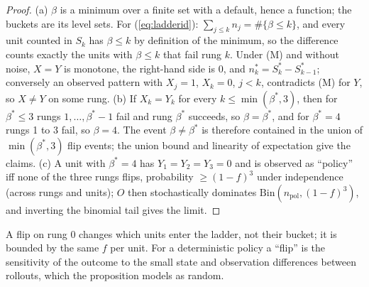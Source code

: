 \documentclass{article}
\begin{document}
\begin{proof}
(a) $\beta$ is a minimum over a finite set with a default, hence a function; the buckets are its level sets. For
(\ref{eq:ladderid}): $\sum_{j\le k} n_j = \#\{\beta \le k\}$, and every unit counted in $S_k$ has $\beta \le k$ by
definition of the minimum, so the difference counts exactly the units with $\beta \le k$ that fail rung $k$. Under
(M) and without noise, $X = Y$ is monotone, the right-hand side is 0, and $n^*_k = S^*_k - S^*_{k-1}$; conversely an
observed pattern with $X_j = 1$, $X_k = 0$, $j < k$, contradicts (M) for $Y$, so $X \ne Y$ on some rung.
(b) If $X_k = Y_k$ for every $k \le \min(\beta^*, 3)$, then for $\beta^* \le 3$ rungs $1, \dots, \beta^* - 1$ fail and
rung $\beta^*$ succeeds, so $\beta = \beta^*$, and for $\beta^* = 4$ rungs 1 to 3 fail, so $\beta = 4$. The event
$\beta \ne \beta^*$ is therefore contained in the union of $\min(\beta^*,3)$ flip events; the union bound and linearity
of expectation give the claims. (c) A unit with $\beta^* = 4$ has $Y_1 = Y_2 = Y_3 = 0$ and is observed as ``policy''
iff none of the three rungs flips, probability $\ge (1-f)^3$ under independence (across rungs and units); $O$ then stochastically dominates
$\mathrm{Bin}(n_{\mathrm{pol}}, (1-f)^3)$, and inverting the binomial tail gives the limit.
\end{proof}

A flip on rung 0 changes which units enter the ladder, not their bucket; it is bounded by the same $f$ per unit. For
a deterministic policy a ``flip'' is the sensitivity of the outcome to the small state and observation differences
between rollouts, which the proposition models as random.
\end{document}
